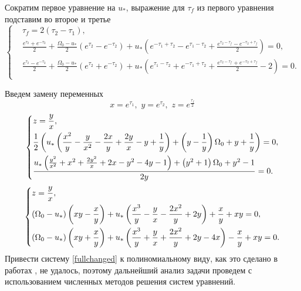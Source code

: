 \documentclass[a4paper,14pt]{article}
\theoremstyle{plain} %
\theoremstyle{definition} %
\theoremstyle{remark} %
\begin{document}
{Сократим первое уравнение на $u_*$, выражение для $\tau_f$ из первого уравнения подставим во второе и третье
\begin{equation}\label{fullconnected}
    \left\{ {\begin{aligned}
                 & \tau_f=2(\tau_2-\tau_1),                                                                                                                                                                 \\
                 & \frac{e^{\tau_2}+e^{-\tau_2}}{2}+\frac{\Omega_0-u_*}{2}(e^{\tau_2}-e^{-\tau_2})+u_*\left(e^{-\tau_1+\tau_2}-e^{\tau_1-\tau_2}+\frac{e^{\tau_2-\tau_f}-e^{-\tau_2+\tau_f}}{2}\right)=0,   \\
                 & \frac{e^{\tau_2}-e^{-\tau_2}}{2}+\frac{\Omega_0-u_*}{2}(e^{\tau_2}+e^{-\tau_2})+u_*\left(e^{\tau_1-\tau_2}+e^{-\tau_1+\tau_2}+\frac{e^{\tau_2-\tau_f}+e^{-\tau_2+\tau_f}}{2}-2\right)=0. \\
            \end{aligned}} \right.
\end{equation}

Введем замену переменных
\[
    x=e^{\tau_1} ,\,\,y=e^{\tau_2} ,\,\,z=e^{\frac{\tau_f}{2}}
\]
\[
    \left\{ {\begin{aligned}
                 & z=\frac{y}{x}, \hfill                                                         \\
                 & \frac{1}{2} \left(u_* \left(\frac{x^2}{y}-\frac{y}{x^2}-\frac{2 x}{y}+\frac{2
                        y}{x}-y+\frac{1}{y}\right)+\left(y-\frac{1}{y}\right) \Omega
                _0+y+\frac{1}{y}\right)=0, \hfill                                                \\
                 & \frac{u_* \left(\frac{y^2}{x^2}+x^2+\frac{2 y^2}{x}+2 x-y^2-4
                y-1\right)+\left(y^2+1\right) \Omega _0+y^2-1}{2 y}=0. \hfill                    \\
            \end{aligned}} \right.
\]
\begin{equation}\label{fullchanged}
    \left\{ {\begin{aligned}
                 & z=\frac{y}{x}, \hfill                                         \\
                 & (\Omega_0-u_*)\left( xy-\frac{x}{y}\right)+u_*\left(\frac{x^3}{y}-\frac{y}{x}-\frac{2x^2}{y}+2y\right)+\frac{x}{y}+xy=0, \hfill      \\
                 & (\Omega_0-u_*)\left( xy+\frac{x}{y}\right)+u_*\left(\frac{x^3}{y}+\frac{y}{x}+\frac{2x^2}{y}+2y-4x\right)-\frac{x}{y}+xy=0. \hfill    \\
            \end{aligned}} \right.
\end{equation}
Привести систему \eqref{fullchanged} к полиномиальному виду, как это сделано в работах \cite{PAKrychinin,kurscah}, не удалось, поэтому
дальнейший анализ задачи проведем с использованием численных методов решения систем уравнений.

}
\end{document}
